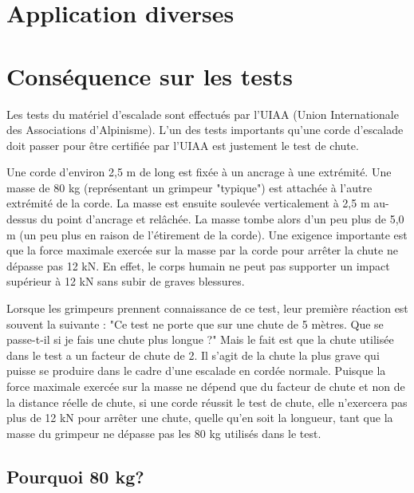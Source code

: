 \documentclass[a4paper,10pt,french]{scrartcl}
\begin{document}
\section{Application diverses}
\section{Conséquence sur les tests}
Les tests du matériel d'escalade sont effectués par l'UIAA (Union Internationale des Associations d'Alpinisme). L'un des tests importants qu'une corde d'escalade doit passer pour être certifiée par l'UIAA est justement le test de chute.

Une corde d'environ 2,5 m de long est fixée à un ancrage à une extrémité. Une masse de 80 kg (représentant un grimpeur "typique") est attachée à l'autre extrémité de la corde. La masse est ensuite soulevée verticalement à 2,5 m au-dessus du point d'ancrage et relâchée. La masse tombe alors d'un peu plus de 5,0 m (un peu plus en raison de l'étirement de la corde).
Une exigence importante est que la force maximale exercée sur la masse par la corde pour arrêter la chute ne dépasse pas 12 kN. En effet, le corps humain ne peut pas supporter un impact supérieur à 12 kN sans subir de graves blessures.

Lorsque les grimpeurs prennent connaissance de ce test, leur première réaction est souvent la suivante : "Ce test ne porte que sur une chute de 5 mètres. Que se passe-t-il si je fais une chute plus longue ?" Mais le fait est que la chute utilisée dans le test a un facteur de chute de 2. Il s'agit de la chute la plus grave qui puisse se produire dans le cadre d'une escalade en cordée normale. Puisque la force maximale exercée sur la masse ne dépend que du facteur de chute et non de la distance réelle de chute, si une corde réussit le test de chute, elle n'exercera pas plus de 12 kN pour arrêter une chute, quelle qu'en soit la longueur, tant que la masse du grimpeur ne dépasse pas les 80 kg utilisés dans le test.


\subsection{Pourquoi 80 kg?}
\end{document}
